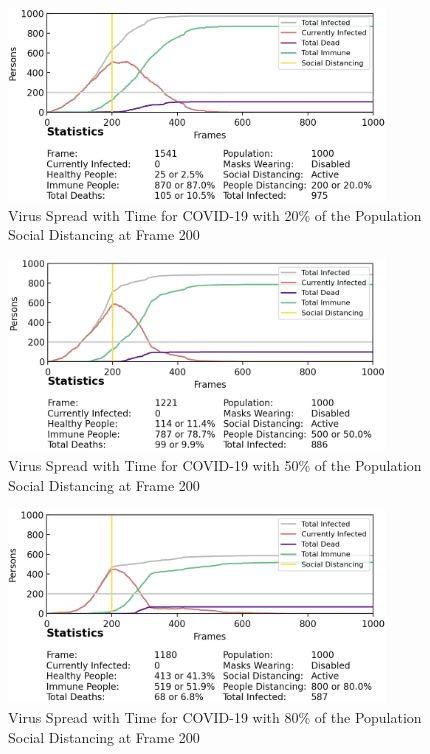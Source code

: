 \documentclass[11pt]{article}
\begin{document}
\begin{enumerate}
    \begin{figure}[H]
    \centering
    \includegraphics[width=10cm]{figures/social_distancing_20percent.png}
    \caption{Virus Spread with Time for COVID-19 with 20\% of the Population Social Distancing at Frame 200}
    \label{social_distancing_20percent}
\end{figure}

\begin{figure}[H]
    \centering
    \includegraphics[width=10cm]{figures/social_distancing_50percent.png}
    \caption{Virus Spread with Time for COVID-19 with 50\% of the Population Social Distancing at Frame 200}
    \label{social_distancing_50percent}
\end{figure}

\begin{figure}[H]
    \centering
    \includegraphics[width=10cm]{figures/social_distancing_80percent.png}
    \caption{Virus Spread with Time for COVID-19 with 80\% of the Population Social Distancing at Frame 200}
    \label{social_distancing_80percent}
\end{figure}


\end{enumerate}
\end{document}
